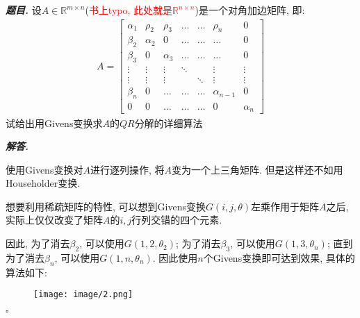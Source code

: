 \documentclass[10pt, a4paper, oneside]{ctexart}
\newenvironment{problem}{\begin{framed}\par\noindent\textbf{\textit{题目. }}}{\end{framed}\par}
\newenvironment{solution}{%
  \par\noindent\textbf{\textit{解答. }}\ignorespaces
}{%
  \hfill\ensuremath{\square}\par %
}
\begin{document}
\begin{problem}
    设$A\in \mathbb{R}^{m\times n}$(\textcolor{red}{书上typo, 此处就是$\mathbb{R}^{n\times n}$})是一个对角加边矩阵, 即:
    \begin{align*}
        A = \begin{bmatrix}
            \alpha_1 & \rho_2 & \rho_3 & \dots & \dots & \rho_n & 0 \\
            \beta_2 & \alpha_2 & 0 & \dots & \dots & \dots & 0 \\
            \beta_3 & 0 & \alpha_3 & \dots & \dots & \dots & 0 \\
            \vdots & \vdots & \vdots & \ddots & & \vdots & \vdots \\
            \vdots & \vdots & \vdots & & \ddots & \vdots & \vdots \\
            \beta_n & 0 & \dots & \dots & \dots & \alpha_{n-1} & 0 \\
            0 & 0 & \dots & \dots & \dots & 0 & \alpha_n
            \end{bmatrix}
    \end{align*}
    试给出用Givens变换求$A$的$QR$分解的详细算法
\end{problem}
\begin{solution}
使用Givens变换对$A$进行逐列操作, 将$A$变为一个上三角矩阵. 但是这样还不如用Householder变换.

想要利用稀疏矩阵的特性, 可以想到Givens变换$G(i,j,\theta)$左乘作用于矩阵$A$之后, 实际上仅仅改变了矩阵$A$的$i,j$行列交错的四个元素.

因此, 为了消去$\beta_2$, 可以使用$G(1,2,\theta_2)$; 为了消去$\beta_3$, 可以使用$G(1,3,\theta_n)$; 直到为了消去$\beta_n$, 可以使用$G(1,n,\theta_n)$. 因此使用$n$个Givens变换即可达到效果, 具体的算法如下:
\begin{figure}[h]
    \centering
    \texttt{[image: image/2.png]}
\end{figure}
\end{solution}
\end{document}
